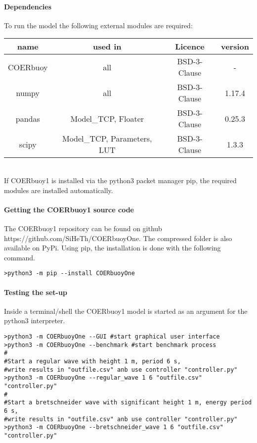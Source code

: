 \documentclass[oneside,10pt,a4paper]{book}
\begin{document}
\paragraph{Dependencies}
To run the model the following external modules are required:\\
	\begin{tabular}{|c|c|c|c|}
		\hline
		name & used in & Licence & version \\
		\hline
		COERbuoy &all&BSD-3-Clause& - \\
		\hline
		numpy &all&BSD-3-Clause& 1.17.4 \\
		\hline
		pandas&Model\_TCP, Floater&BSD-3-Clause&0.25.3\\
		\hline
		scipy&Model\_TCP, Parameters, LUT&BSD-3-Clause&1.3.3\\
		\hline
	\end{tabular}\\
If COERbuoy1 is installed via the python3 packet manager pip, the required modules are installed automatically.
\paragraph{Getting the COERbuoy1 source code}
The COERbuoy1 repository can be found on github https://github.com/SiHeTh/COERbuoyOne. The compressed folder is also available on PyPi. Using pip, the installation is done with the following command.
\begin{verbatim}
>python3 -m pip --install COERbuoyOne
\end{verbatim}
\paragraph{Testing the set-up}
Inside a terminal/shell the COERbuoy1 model is started as an argument for the python3 interpreter.
\begin{verbatim}
>python3 -m COERbuoyOne --GUI #start graphical user interface
>python3 -m COERbuoyOne --benchmark #start benchmark process
#
#Start a regular wave with height 1 m, period 6 s,
#write results in "outfile.csv" anb use controller "controller.py"
>python3 -m COERbuoyOne --regular_wave 1 6 "outfile.csv" "controller.py"
#
#Start a bretschneider wave with significant height 1 m, energy period 6 s,
#write results in "outfile.csv" anb use controller "controller.py"
>python3 -m COERbuoyOne --bretschneider_wave 1 6 "outfile.csv" "controller.py"
\end{verbatim}
\end{document}
